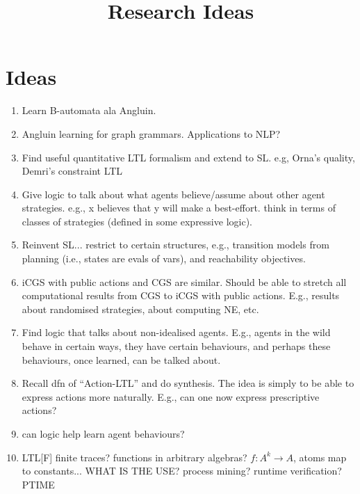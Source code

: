 \documentclass[a4paper,10pt]{article}
\title{Research Ideas}
\begin{document}
\maketitle


\section{Ideas}

\begin{enumerate} 

\item Learn B-automata ala Angluin.

\item Angluin learning for graph grammars. Applications to NLP?

\item Find useful quantitative LTL formalism and extend to SL. e.g, Orna's
quality, Demri's constraint LTL

\item Give logic to talk about what agents believe/assume about other agent strategies. e.g., x believes that y will make a best-effort. think in terms of classes of strategies (defined in some expressive logic).

\item Reinvent SL... restrict to certain structures, e.g., transition models from planning (i.e., states are evals of vars), and reachability objectives.

\item iCGS with public actions and CGS are similar. Should be able to stretch all computational results from CGS to iCGS with public actions. E.g., results about randomised strategies, about computing NE, etc. 

\item Find logic that talks about non-idealised agents. E.g., agents in the wild behave in certain ways, they have certain behaviours, and perhaps these behaviours, once learned, can be talked about. 


\item Recall dfn of ``Action-LTL'' and do synthesis. The idea is simply to be able to express actions more naturally. E.g., can one now express prescriptive actions? 

\item can logic help learn agent behaviours?

 \item 
LTL[F] 
finite traces?
functions in arbitrary algebras? $f:A^k \to A$, atoms map to constants... WHAT IS THE USE?
process mining?
runtime verification? PTIME


\end{enumerate}
\end{document}
